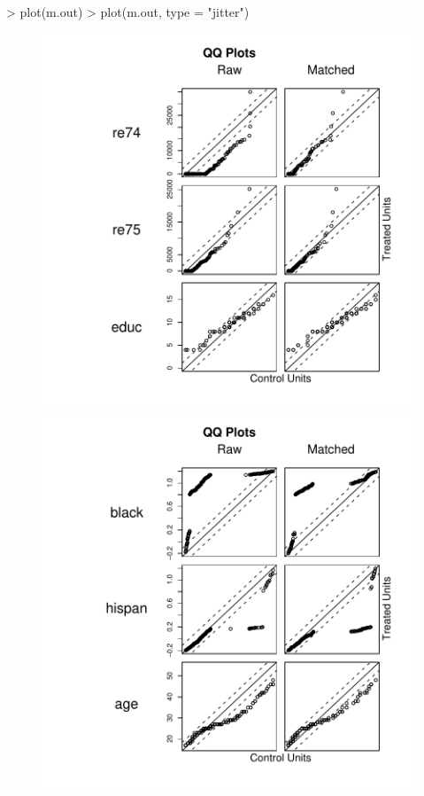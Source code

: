 \documentclass[oneside,letterpaper,titlepage]{article}
\begin{document}
\begin{enumerate}
\begin{Schunk}
\begin{Sinput}
> plot(m.out)
> plot(m.out, type = "jitter")
\end{Sinput}
\end{Schunk}

\begin{figure}[tbp]
  \begin{center}
    \includegraphics[scale=0.25]{figs/qqplotnn}
    \includegraphics[scale=0.25]{figs/qqplotnn2} 

\end{center}
\end{figure}
\end{enumerate}
\end{document}
